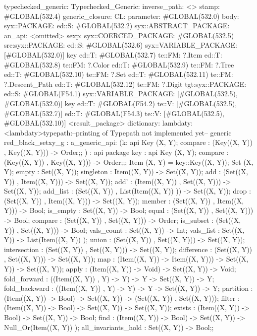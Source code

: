 typechecked_generic:
Typechecked_Generic:
inverse_path: <>
stamp: #GLOBAL(532.4)
generic_closure:
CL:
parameter: #GLOBAL(532.0)
body: syx::PACKAGE:
        ed::S: #GLOBAL(532.2)
            syx::ABSTRACT_PACKAGE:
                an_api: <omitted>
                sexp:
                    syx::COERCED_PACKAGE:
                        #GLOBAL(532.5)
                         src:syx::PACKAGE:
                                ed::S: #GLOBAL(532.6) syx::VARIABLE_PACKAGE: [#GLOBAL(532.0)] key
                                ed::T: #GLOBAL(532.7) te::FM: ?.Item
                                ed::T: #GLOBAL(532.8) te::FM: ?.Color
                                ed::T: #GLOBAL(532.9) te::FM: ?.Tree
                                ed::T: #GLOBAL(532.10) te::FM: ?.Set
                                ed::T: #GLOBAL(532.11) te::FM: ?.Descent_Path
                                ed::T: #GLOBAL(532.12) te::FM: ?.Digit
                        tgt:syx::PACKAGE:
                            ed::S: #GLOBAL(F54.1)
                             syx::VARIABLE_PACKAGE:
                             [#GLOBAL(532.5), #GLOBAL(532.0)]
                             key
                            ed::T: #GLOBAL(F54.2)
                             te::V:
                             [#GLOBAL(532.5), #GLOBAL(532.7)]
                            ed::T: #GLOBAL(F54.3)
                             te::V:
                             [#GLOBAL(532.5), #GLOBAL(532.10)]
         <result_package>
dictionary:
lambdaty:
  <lambdaty>typepath:--printing of Typepath not implemented yet--
generic red_black_setxy_g
:
a_generic_api:
(k:
api {
    Key (X, Y);
    compare : (Key((X, Y)) , Key((X, Y))) -> Order;};
)
:
api {   package key
          : api {
                Key (X, Y);
                compare : (Key((X, Y)) , Key((X, Y))) -> Order;};;
    Item (X, Y) = key::Key((X, Y));
    Set (X, Y);
    empty : Set((X, Y));
    singleton : Item((X, Y)) -> Set((X, Y));
    add : (Set((X, Y)) , Item((X, Y))) -> Set((X, Y));
    add' : (Item((X, Y)) , Set((X, Y))) -> Set((X, Y));
    add_list : (Set((X, Y)) , List(Item((X, Y)) )) -> Set((X, Y));
    drop : (Set((X, Y)) , Item((X, Y))) -> Set((X, Y));
    member : (Set((X, Y)) , Item((X, Y))) -> Bool;
    is_empty : Set((X, Y)) -> Bool;
    equal : (Set((X, Y)) , Set((X, Y))) -> Bool;
    compare : (Set((X, Y)) , Set((X, Y))) -> Order;
    is_subset : (Set((X, Y)) , Set((X, Y))) -> Bool;
    vals_count : Set((X, Y)) -> Int;
    vals_list : Set((X, Y)) -> List(Item((X, Y)) );
    union : (Set((X, Y)) , Set((X, Y))) -> Set((X, Y));
    intersection : (Set((X, Y)) , Set((X, Y))) -> Set((X, Y));
    difference : (Set((X, Y)) , Set((X, Y))) -> Set((X, Y));
    map : (Item((X, Y)) -> Item((X, Y))) -> Set((X, Y)) -> Set((X, Y));
    apply : (Item((X, Y)) -> Void) -> Set((X, Y)) -> Void;
    fold_forward : ((Item((X, Y)) , Y) -> Y) -> Y -> Set((X, Y)) -> Y;
    fold_backward : ((Item((X, Y)) , Y) -> Y) -> Y -> Set((X, Y)) -> Y;
    partition : (Item((X, Y)) -> Bool) -> Set((X, Y)) -> (Set((X, Y)) , Set((X, Y)));
    filter : (Item((X, Y)) -> Bool) -> Set((X, Y)) -> Set((X, Y));
    exists : (Item((X, Y)) -> Bool) -> Set((X, Y)) -> Bool;
    find : (Item((X, Y)) -> Bool) -> Set((X, Y)) -> Null_Or(Item((X, Y)) );
    all_invariants_hold : Set((X, Y)) -> Bool;};

